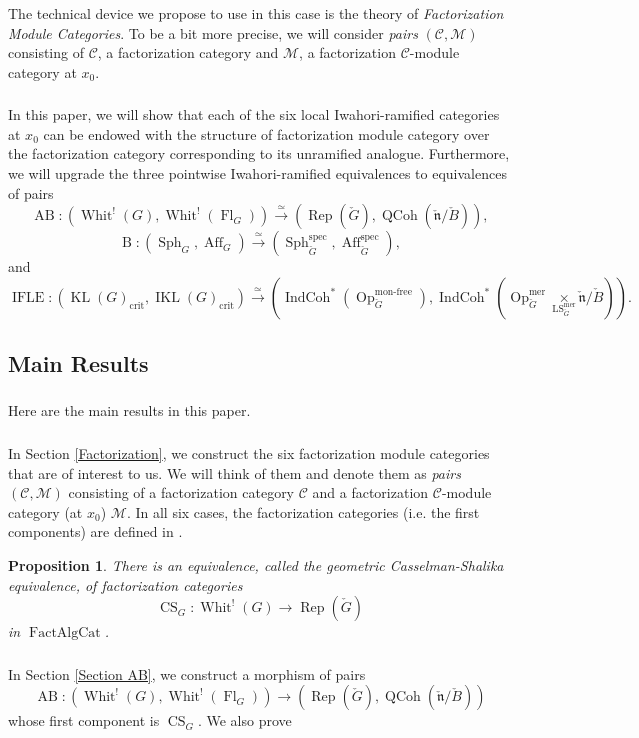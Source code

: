 \documentclass[10pt]{amsart}
\newtheorem{prop}[subsubsection]{Proposition}
\theoremstyle{remark}
\newcommand{\on}[1]{\operatorname{#1}}
\newcommand{\QCoh}{\on{QCoh}}
\newcommand{\IndCoh}{\on{IndCoh}}
\newcommand{\KL}{\on{KL}(G)_{\on{crit}}}
\newcommand{\IKL}{\on{IKL}(G)_{\on{crit}}}
\newcommand{\Gcheck}{\check{G}}
\newcommand{\ncheck}{\check{\mathfrak{n}}}
\newcommand{\Bcheck}{\check{B}}
\newcommand{\FactAlgCat}{\on{FactAlgCat}}
\newcommand{\sssec}[1]{\subsubsection{}}
\begin{document}
\sssec{}
The technical device we propose to use in this case is the theory of \emph{Factorization Module Categories}. To be a bit more precise, we will consider \emph{pairs} $(\mathcal{C}, \mathcal{M})$ consisting of $\mathcal{C}$, a factorization category and $\mathcal{M}$, a factorization $\mathcal{C}$-module category at $x_0$.

\sssec{}
In this paper, we will show that each of the six local Iwahori-ramified categories at $x_0$ can be endowed with the structure of factorization module category over the factorization category corresponding to its unramified analogue. Furthermore, we will upgrade the three pointwise Iwahori-ramified equivalences to equivalences of pairs
$$
\on{AB} : (\on{Whit}^!(G), \on{Whit}^!(\on{Fl}_G)) \overset{\simeq}{\longrightarrow} (\on{Rep}(\Gcheck), \QCoh(\ncheck/\Bcheck)),
$$
$$
\on{B} : (\on{Sph}_G, \on{Aff}_{G}) \overset{\simeq}{\longrightarrow} (\on{Sph}_{\Gcheck}^{\on{spec}}, \on{Aff}_{\Gcheck}^{\on{spec}}),
$$
and
$$
\on{IFLE} : (\KL, \IKL) \overset{\simeq}{\longrightarrow} (\IndCoh^*(\on{Op}_{\Gcheck}^{\on{mon-free}}), \IndCoh^*(\on{Op}_{\Gcheck}^{\on{mer}} \underset{\on{LS}_{\Gcheck}^{\on{mer}}}{\times} \ncheck/\Bcheck)).
$$

\subsection{Main Results}
\sssec{}
Here are the main results in this paper.

\sssec{}
In Section \ref{Factorization}, we construct the six factorization module categories that are of interest to us. We will think of them and denote them as \emph{pairs} $(\mathcal{C}, \mathcal{M})$ consisting of a factorization category $\mathcal{C}$ and a factorization $\mathcal{C}$-module category (at $x_0$) $\mathcal{M}$. In all six cases, the factorization categories (i.e. the first components) are defined in \cite{GLC2}.

\begin{prop} \cite{GLC2}
    There is an equivalence, called the geometric Casselman-Shalika equivalence, of factorization categories
    $$
    \on{CS}_G : \on{Whit}^!(G) \longrightarrow \on{Rep}(\Gcheck)
    $$
    in $\FactAlgCat$.
\end{prop}

\sssec{}
In Section \ref{Section AB}, we construct a morphism of pairs
$$
\on{AB} : (\on{Whit}^!(G), \on{Whit}^!(\on{Fl}_G)) \longrightarrow (\on{Rep}(\Gcheck), \QCoh(\ncheck/\Bcheck))
$$
whose first component is $\on{CS}_G$. We also prove
\end{document}
